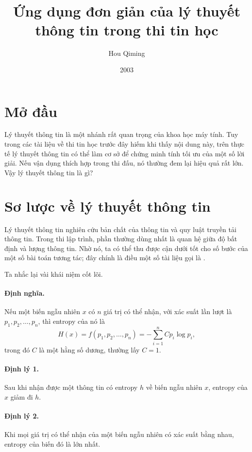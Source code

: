 \documentclass[11pt]{article}
\title{Ứng dụng đơn giản của lý thuyết thông tin trong thi tin học}
\author{Hou Qiming}
\date{2003}
\begin{document}
\maketitle


\section{Mở đầu}

Lý thuyết thông tin là một nhánh rất quan trọng của khoa học máy tính. Tuy
trong các tài liệu về thi tin học trước đây hiếm khi thấy nội dung này, trên
thực tế lý thuyết thông tin có thể làm cơ sở để chứng minh tính tối ưu của
một số lời giải. Nếu vận dụng thích hợp trong thi đấu, nó thường đem lại hiệu
quả rất lớn. Vậy lý thuyết thông tin là gì?

\section{Sơ lược về lý thuyết thông tin}

Lý thuyết thông tin nghiên cứu bản chất của thông tin và quy luật truyền tải
thông tin. Trong thi lập trình, phần thường dùng nhất là quan hệ giữa độ bất
định và lượng thông tin. Nhờ nó, ta có thể thu được cận dưới tốt cho số bước
của một số bài toán tương tác; đây chính là điều một số tài liệu gọi là
.

Ta nhắc lại vài khái niệm cốt lõi.

\paragraph{Định nghĩa.}
Nếu một biến ngẫu nhiên \(x\) có \(n\) giá trị có thể nhận, với xác suất lần
lượt là \(p_1,p_2,\ldots,p_n\), thì entropy của nó là
\[
  H(x)=f(p_1,p_2,\ldots,p_n)
  =-\sum_{i=1}^{n} C p_i\log p_i,
\]
trong đó \(C\) là một hằng số dương, thường lấy \(C=1\).

\paragraph{Định lý 1.}
Sau khi nhận được một thông tin có entropy \(h\) về biến ngẫu nhiên \(x\),
entropy của \(x\) giảm đi \(h\).

\paragraph{Định lý 2.}
Khi mọi giá trị có thể nhận của một biến ngẫu nhiên có xác suất bằng nhau,
entropy của biến đó là lớn nhất.
\end{document}
